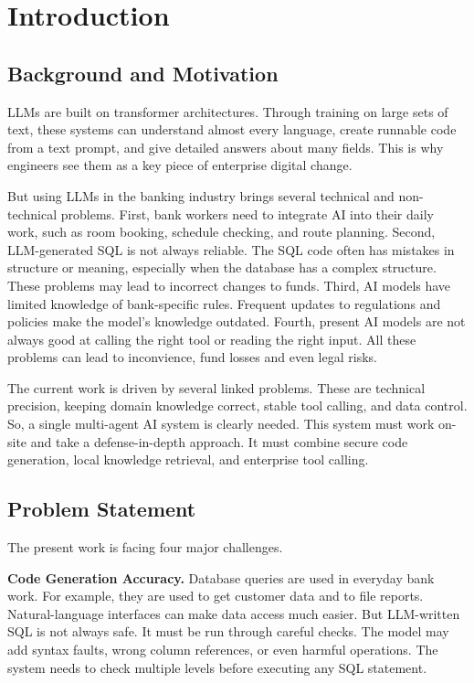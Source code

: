 \setcounter{page}{1}
\section{Introduction}

\subsection{Background and Motivation}

LLMs are built on transformer architectures. Through training on large sets of text, these systems can understand almost every language, create runnable code from a text prompt, and give detailed answers about many fields. This is why engineers see them as a key piece of enterprise digital change.

But using LLMs in the banking industry brings several technical and non-technical problems. First, bank workers need to integrate AI into their daily work, such as room booking, schedule checking, and route planning. Second, LLM-generated SQL is not always reliable. The SQL code often has mistakes in structure or meaning, especially when the database has a complex structure. These problems may lead to incorrect changes to funds. Third, AI models have limited knowledge of bank-specific rules. Frequent updates to regulations and policies make the model's knowledge outdated. Fourth, present AI models are not always good at calling the right tool or reading the right input. All these problems can lead to inconvience, fund losses and even legal risks.

The current work is driven by several linked problems. These are technical precision, keeping domain knowledge correct, stable tool calling, and data control. So, a single multi-agent AI system is clearly needed. This system must work on-site and take a defense-in-depth approach. It must combine secure code generation, local knowledge retrieval, and enterprise tool calling.

\subsection{Problem Statement}

The present work is facing four major challenges.

\textbf{Code Generation Accuracy.} Database queries are used in everyday bank work. For example, they are used to get customer data and to file reports. Natural-language interfaces can make data access much easier. But LLM-written SQL is not always safe. It must be run through careful checks. The model may add syntax faults, wrong column references, or even harmful operations. The system needs to check multiple levels before executing any SQL statement.

